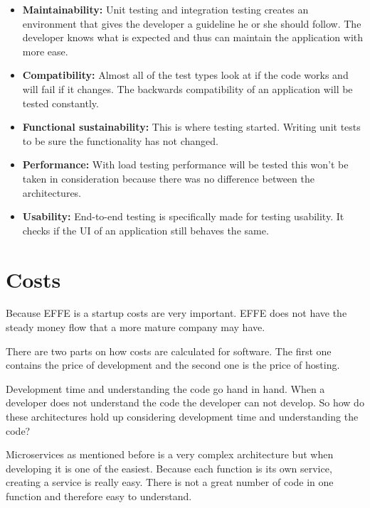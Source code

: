 \begin{itemize}
        \item \textbf{Maintainability:} Unit testing and integration testing creates an environment that gives the developer a guideline he or she should follow. The developer knows what is expected and thus can maintain the application with more ease.

        \item \textbf{Compatibility:} Almost all of the test types look at if the code works and will fail if it changes. The backwards compatibility of an application will be tested constantly.

        \item \textbf{Functional sustainability:} This is where testing started. Writing unit tests to be sure the functionality has not changed.

        \item \textbf{Performance:} With load testing performance will be tested this won’t be taken in consideration because there was no difference between the architectures.

        \item \textbf{Usability:} End-to-end testing is specifically made for testing usability. It checks if the UI of an application still behaves the same.
\end{itemize}

\section{Costs}
\label{sec:Costs}

Because EFFE is a startup costs are very important. EFFE does not have the steady money flow that a more mature company may have.

There are two parts on how costs are calculated for software. The first one contains the price of development and the second one is the price of hosting.

Development time and understanding the code go hand in hand. When a developer does not understand the code the developer can not develop. So how do these architectures hold up considering development time and understanding the code?

Microservices as mentioned before is a very complex architecture but when developing it is one of the easiest. Because each function is its own service, creating a service is really easy. There is not a great number of code in one function and therefore easy to understand.

